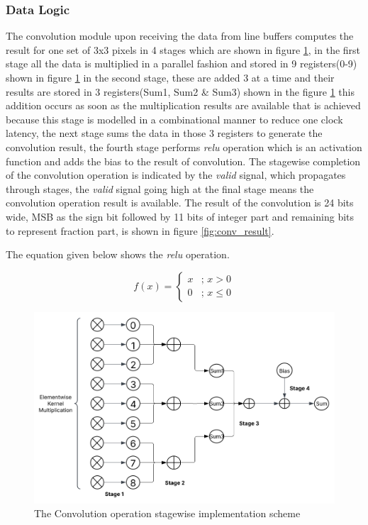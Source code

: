     \noindent
    \subsubsection{Data Logic}
    \noindent
    The convolution module upon receiving the data from line buffers computes the result for one set of 3x3 pixels in 4 stages which are shown in figure \ref{fig:pipeline_architecture}, in the first stage all the data is multiplied in a parallel fashion and stored in 9 registers(0-9) shown in figure \ref{fig:pipeline_architecture} in the second stage, these are added 3 at a time and their results are stored in 3 registers(Sum1, Sum2 \& Sum3) shown in the figure \ref{fig:pipeline_architecture} this addition occurs as soon as the multiplication results are available that is achieved because this stage is modelled in a combinational manner to reduce one clock latency, the next stage sums the data in those 3 registers to generate the convolution result, the fourth stage performs \textit{relu} operation which is an activation function and adds the bias to the result of convolution. The stagewise completion of the convolution operation is indicated by the \textit{valid} signal, which propagates through stages, the \textit{valid} signal going high at the final stage means the convolution operation result is available. The result of the convolution is 24 bits wide, MSB as the sign bit followed by 11 bits of integer part and remaining bits to represent fraction part, is shown in figure \ref{fig:conv_result}.

    \noindent The equation given below shows the \textit{relu} operation.

    \[
    f(x) =
    \begin{cases} 
    x & \text{;  } x > 0 \\
    0 & \text{;  } x \leq 0
    \end{cases}
    \]

    \begin{figure}[H]
    \centering
    \includegraphics[width=\linewidth]{images/MAC_Unit.png} 
    \caption{The Convolution operation stagewise implementation scheme}
    \label{fig:pipeline_architecture}
    \end{figure}

